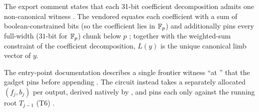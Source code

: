 \begin{specdelta}
The export comment states that each 31-bit coefficient decomposition admits one
non-canonical witness .
The vendored  equates each coefficient with a sum of
boolean-constrained bits (so the coefficient lies in $\mathbb{F}_p$) and additionally pins
every full-width ($31$-bit for $\mathbb{F}_p$) chunk below $p$
;
together with the weighted-sum constraint of the coefficient decomposition,
$L(y)$ is the unique canonical limb vector of $y$.
\end{specdelta}

\begin{specdelta}
The entry-point documentation describes a single frontier witness ``at
'' that the gadget pins before appending
. The circuit instead takes a
separately allocated $(f_j,b_j)$ per output, derived natively by
 , and pins
each only against the running root $T_{j-1}$ (T6) .
\end{specdelta}
